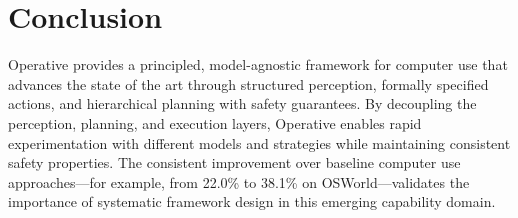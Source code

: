 \section{Conclusion}

\label{sec:conclusion}

Operative provides a principled, model-agnostic framework for computer use that advances the state of the art through structured perception, formally specified actions, and hierarchical planning with safety guarantees. By decoupling the perception, planning, and execution layers, Operative enables rapid experimentation with different models and strategies while maintaining consistent safety properties. The consistent improvement over baseline computer use approaches---for example, from 22.0\% to 38.1\% on OSWorld---validates the importance of systematic framework design in this emerging capability domain.

